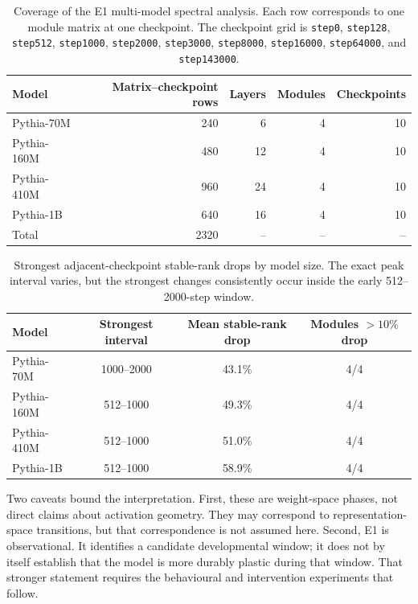 \begin{table}[t]
  \centering
  \small
  \begin{tabular}{lrrrr}
    \toprule
    Model & Matrix--checkpoint rows & Layers & Modules & Checkpoints \\
    \midrule
    Pythia-70M  & 240 & 6  & 4 & 10 \\
    Pythia-160M & 480 & 12 & 4 & 10 \\
    Pythia-410M & 960 & 24 & 4 & 10 \\
    Pythia-1B   & 640 & 16 & 4 & 10 \\
    \midrule
    Total & 2320 & -- & -- & -- \\
    \bottomrule
  \end{tabular}
  \caption{Coverage of the E1 multi-model spectral analysis. Each row corresponds to one module
  matrix at one checkpoint. The checkpoint grid is \texttt{step0}, \texttt{step128},
  \texttt{step512}, \texttt{step1000}, \texttt{step2000}, \texttt{step3000}, \texttt{step8000},
  \texttt{step16000}, \texttt{step64000}, and \texttt{step143000}.}
  \label{tab:e1-coverage}
\end{table}

\begin{table}[t]
  \centering
  \small
  \begin{tabular}{lccc}
    \toprule
    Model & Strongest interval & Mean stable-rank drop & Modules $>10\%$ drop \\
    \midrule
    Pythia-70M  & 1000--2000 & 43.1\% & 4/4 \\
    Pythia-160M & 512--1000  & 49.3\% & 4/4 \\
    Pythia-410M & 512--1000  & 51.0\% & 4/4 \\
    Pythia-1B   & 512--1000  & 58.9\% & 4/4 \\
    \bottomrule
  \end{tabular}
  \caption{Strongest adjacent-checkpoint stable-rank drops by model size. The exact peak interval
  varies, but the strongest changes consistently occur inside the early 512--2000-step window.}
  \label{tab:e1-peak-intervals}
\end{table}

Two caveats bound the interpretation. First, these are weight-space phases, not direct claims about
activation geometry. They may correspond to representation-space transitions, but that
correspondence is not assumed here. Second, E1 is observational. It identifies a candidate
developmental window; it does not by itself establish that the model is more durably plastic during
that window. That stronger statement requires the behavioural and intervention experiments that
follow.

